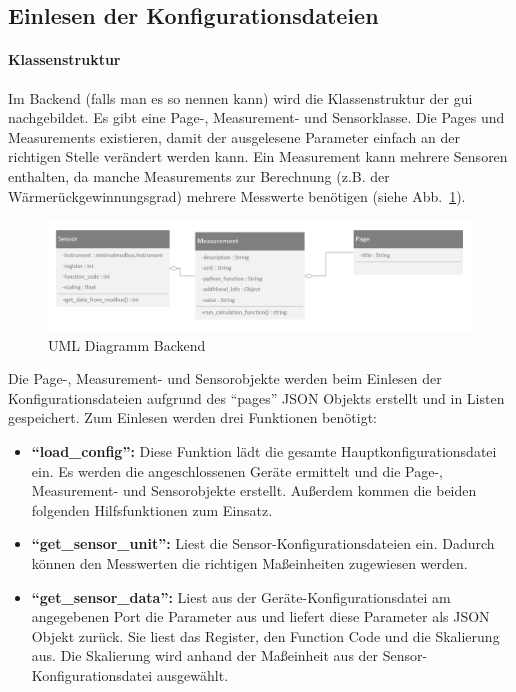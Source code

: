 \subsection{Einlesen der Konfigurationsdateien}
\paragraph{Klassenstruktur}
Im Backend (falls man es so nennen kann) wird die Klassenstruktur der \acs{gui} nachgebildet. Es gibt eine Page-, Measurement- und Sensorklasse. Die Pages und Measurements existieren, damit der ausgelesene Parameter einfach an der richtigen Stelle verändert werden kann. Ein Measurement kann mehrere Sensoren enthalten, da manche Measurements zur Berechnung  (z.B. der Wärmerückgewinnungsgrad) mehrere Messwerte benötigen (siehe Abb.~\ref{fig:uml_backend}).
\begin{figure}[ht]
	\centering
	\includegraphics[width=1.0\linewidth]{Bilder/UML_Backend}
	\caption{UML Diagramm Backend}
	\label{fig:uml_backend}
\end{figure}

Die Page-, Measurement- und Sensorobjekte werden beim Einlesen der Konfigurationsdateien aufgrund des \enquote{pages} JSON Objekts erstellt und in Listen gespeichert. \newline
Zum Einlesen werden drei Funktionen benötigt:
\begin{itemize}
	\item \textbf{\enquote{load\_config}:} Diese Funktion lädt die gesamte Hauptkonfigurationsdatei ein. Es werden die angeschlossenen Geräte ermittelt und die Page-, Measurement- und Sensorobjekte erstellt. Außerdem kommen die beiden folgenden Hilfsfunktionen zum Einsatz.
	\item \textbf{\enquote{get\_sensor\_unit}:} Liest die Sensor-Konfigurationsdateien ein. Dadurch können den Messwerten die richtigen Maßeinheiten zugewiesen werden.
	\item \textbf{\enquote{get\_sensor\_data}:} Liest aus der Geräte-Konfigurationsdatei am angegebenen Port die Parameter aus und liefert diese Parameter als JSON Objekt zurück. Sie liest das Register, den Function Code und die Skalierung aus. Die Skalierung wird anhand der Maßeinheit aus der Sensor-Konfigurationsdatei ausgewählt.
\end{itemize}

